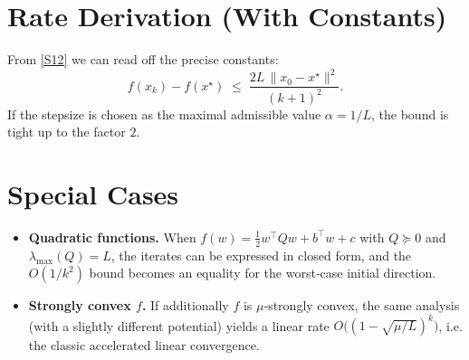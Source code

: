 \documentclass{article}
\begin{document}
\section*{Rate Derivation (With Constants)}
From \eqref{S12} we can read off the precise constants:
\[
\boxed{
f(x_k)-f(x^\star)\;\le\;
\frac{2L\,\|x_0-x^\star\|^{2}}{(k+1)^{2}} } .
\]
If the stepsize is chosen as the maximal admissible value
$\alpha=1/L$, the bound is tight up to the factor $2$.

\section*{Special Cases}
\begin{itemize}
\item \textbf{Quadratic functions.}
When $f(w)=\frac{1}{2}w^{\top}Qw+b^{\top}w+c$ with $Q\succeq0$ and
$\lambda_{\max}(Q)=L$, the iterates can be expressed in closed form,
and the $O(1/k^{2})$ bound becomes an equality for the worst‑case
initial direction.
\item \textbf{Strongly convex $f$.}
If additionally $f$ is $\mu$‑strongly convex, the same analysis
(with a slightly different potential) yields a linear rate
$O\bigl((1-\sqrt{\mu/L})^{k}\bigr)$, i.e. the classic accelerated
linear convergence.
\end{itemize}

\end{document}
